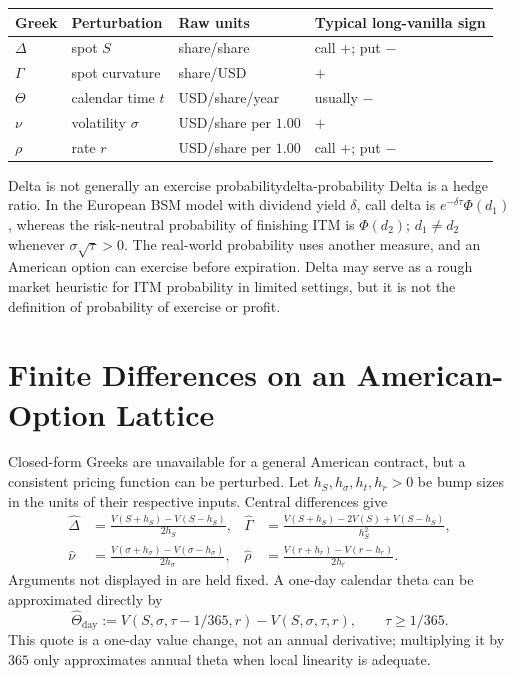 \documentclass[11pt]{article}
\begin{document}
\begin{center}
\small
\begin{tabular}{llll}
  \hline
  Greek & Perturbation & Raw units & Typical long-vanilla sign \\
  \hline
  $\Delta$ & spot $S$ & share/share & call $+$; put $-$ \\
  $\Gamma$ & spot curvature & share/USD & $+$ \\
  $\Theta$ & calendar time $t$ & USD/share/year & usually $-$ \\
  $\nu$ & volatility $\sigma$ & USD/share per $1.00$ & $+$ \\
  $\rho$ & rate $r$ & USD/share per $1.00$ & call $+$; put $-$ \\
  \hline
\end{tabular}
\end{center}

\begin{remark}{Delta is not generally an exercise probability}{delta-probability}
Delta is a hedge ratio. In the European BSM model with dividend yield $\delta$, call delta is $e^{-\delta\tau}\Phi(d_1)$, whereas the risk-neutral probability of finishing ITM is $\Phi(d_2)$; $d_1\neq d_2$ whenever $\sigma\sqrt\tau>0$. The real-world probability uses another measure, and an American option can exercise before expiration. Delta may serve as a rough market heuristic for ITM probability in limited settings, but it is not the definition of probability of exercise or profit.
\end{remark}

\section{Finite Differences on an American-Option Lattice}

Closed-form Greeks are unavailable for a general American contract, but a consistent pricing function can be perturbed. Let $h_S,h_\sigma,h_t,h_r>0$ be bump sizes in the units of their respective inputs. Central differences give
\begin{align}
  \label{eq:finite-differences}
  \widehat\Delta
  &=\frac{V(S+h_S)-V(S-h_S)}{2h_S},
  &
  \widehat\Gamma
  &=\frac{V(S+h_S)-2V(S)+V(S-h_S)}{h_S^2},\\
  \widehat\nu
  &=\frac{V(\sigma+h_\sigma)-V(\sigma-h_\sigma)}{2h_\sigma},
  &
  \widehat\rho
  &=\frac{V(r+h_r)-V(r-h_r)}{2h_r}.
\end{align}
Arguments not displayed in  are held fixed. A one-day calendar theta can be approximated directly by
\begin{equation}
  \label{eq:theta-day}
  \widehat\Theta_{\mathrm{day}}
  :=V(S,\sigma,\tau-1/365,r)-V(S,\sigma,\tau,r),
  \qquad \tau\geq 1/365.
\end{equation}
This quote is a one-day value change, not an annual derivative; multiplying it by $365$ only approximates annual theta when local linearity is adequate.
\end{document}
